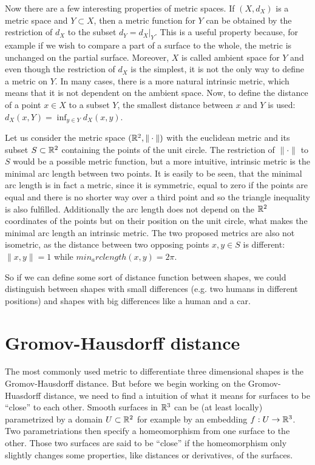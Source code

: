 Now there are a few interesting properties of metric spaces.
If $(X,d_X)$ is a metric space and $Y \subset X$, then a metric function for $Y$ can be obtained by the restriction of $d_X$ to the subset $d_Y = \left.d_X\right|_Y$.
This is a useful property because, for example if we wish to compare a part of a surface to the whole, the metric is unchanged on the partial surface.
Moreover, $X$ is called ambient space for $Y$ and even though the restriction of $d_X$ is the simplest, it is not the only way to define a metric on $Y$.
In many cases, there is a more natural intrinsic metric, which means that it is not dependent on the ambient space.
Now, to define the distance of a point $x \in X$ to a subset $Y$, the smallest distance between $x$ and $Y$ is used: $d_X(x,Y) = \inf_{y \in Y} d_X(x,y)$.

\begin{example}
Let us consider the metric space $(\mathbb{R}^2, \|\cdot\|)$ with the euclidean metric and its subset $S \subset \mathbb{R}^2$ containing the points of the unit circle.
The restriction of $\|\cdot\|$ to $S$ would be a possible metric function, but a more intuitive, intrinsic metric is the minimal arc length between two points.
It is easily to be seen, that the minimal arc length is in fact a metric, since it is symmetric, equal to zero if the points are equal and there is no shorter way over a third point and so the triangle inequality is also fulfilled.
Additionally the arc length does not depend on the $\mathbb{R}^2$ coordinates of the points but on their position on the unit circle, what makes the minimal arc length an intrinsic metric.
The two proposed metrics are also not isometric, as the distance between two opposing points $x,y\in S$ is different: $\|x,y\| = 1$ while $min_arclength(x,y) = 2\pi$.
\end{example}

So if we can define some sort of distance function between shapes, we could distinguish between shapes with small differences (e.g. two humans in different positions) and shapes with big differences like a human and a car.

\section{Gromov-Hausdorff distance}
The most commonly used metric to differentiate three dimensional shapes is the Gromov-Hausdorff distance.
But before we begin working on the Gromov-Huasdorff distance, we need to find a intuition of what it means for surfaces to be ``close'' to each other.
Smooth surfaces in $\mathbb{R}^3$ can be (at least locally) parametrized by a domain $U \subset \mathbb{R}^2$ for example by an embedding $f: U\rightarrow \mathbb{R}^3$.
Two parametriations then specify a homeomorphism from one surface to the other.
Those two surfaces are said to be ``close'' if the homeomorphism only slightly changes some properties, like distances or derivatives, of the surfaces.
